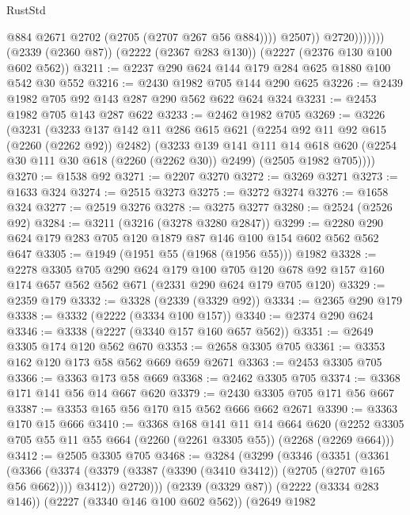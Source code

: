 \begin{lexlean}{RustStd}
\begin{coremodule}
                          @884
                          @2671
                          @2702
                          (@2705 (@2707 @267 @56 @884))))
                      @2507))
                  @2720)))))))
    (@2339 (@2360 @87))
    (@2222 (@2367 @283 @130))
    (@2227 (@2376 @130 @100 @602 @562))
@3211 := @2237 @290 @624 @144 @179 @284 @625 @1880 @100 @542 @30 @552
@3216 := @2430 @1982 @705 @144 @290 @625
@3226 := @2439 @1982 @705 @92 @143 @287 @290 @562 @622 @624 @324
@3231 := @2453 @1982 @705 @143 @287 @622
@3233 := @2462 @1982 @705
@3269 := @3226
    (@3231
      (@3233
        @137
        @142
        @11
        @286
        @615
        @621
        (@2254 @92 @11 @92 @615 (@2260 (@2262 @92)) @2482)
        (@3233
          @139
          @141
          @111
          @14
          @618
          @620
          (@2254 @30 @111 @30 @618 (@2260 (@2262 @30)) @2499)
          (@2505 @1982 @705))))
@3270 := @1538 @92
@3271 := @2207 @3270
@3272 := @3269 @3271
@3273 := @1633 @324
@3274 := @2515 @3273
@3275 := @3272 @3274
@3276 := @1658 @324
@3277 := @2519 @3276
@3278 := @3275 @3277
@3280 := @2524 (@2526 @92)
@3284 := @3211 (@3216 (@3278 @3280 @2847))
@3299 := @2280 @290 @624 @179 @283 @705 @120 @1879 @87 @146 @100 @154 @602 @562 @562 @647
@3305 := @1949 (@1951 @55 (@1968 (@1956 @55))) @1982
@3328 := @2278
    @3305
    @705
    @290
    @624
    @179
    @100
    @705
    @120
    @678
    @92
    @157
    @160
    @174
    @657
    @562
    @562
    @671
    (@2331 @290 @624 @179 @705 @120)
@3329 := @2359 @179
@3332 := @3328 (@2339 (@3329 @92))
@3334 := @2365 @290 @179
@3338 := @3332 (@2222 (@3334 @100 @157))
@3340 := @2374 @290 @624
@3346 := @3338 (@2227 (@3340 @157 @160 @657 @562))
@3351 := @2649 @3305 @174 @120 @562 @670
@3353 := @2658 @3305 @705
@3361 := @3353 @162 @120 @173 @58 @562 @669 @659 @2671
@3363 := @2453 @3305 @705
@3366 := @3363 @173 @58 @669
@3368 := @2462 @3305 @705
@3374 := @3368 @171 @141 @56 @14 @667 @620
@3379 := @2430 @3305 @705 @171 @56 @667
@3387 := @3353 @165 @56 @170 @15 @562 @666 @662 @2671
@3390 := @3363 @170 @15 @666
@3410 := @3368
    @168
    @141
    @11
    @14
    @664
    @620
    (@2252 @3305 @705 @55 @11 @55 @664 (@2260 (@2261 @3305 @55)) (@2268 (@2269 @664)))
@3412 := @2505 @3305 @705
@3468 := @3284
    (@3299
      (@3346
        (@3351
          (@3361
            (@3366
              (@3374 (@3379 (@3387 (@3390 (@3410 @3412)) (@2705 (@2707 @165 @56 @662)))) @3412))
            @2720)))
      (@2339 (@3329 @87))
      (@2222 (@3334 @283 @146))
      (@2227 (@3340 @146 @100 @602 @562))
      (@2649
        @1982

\end{coremodule}
\end{lexlean}
